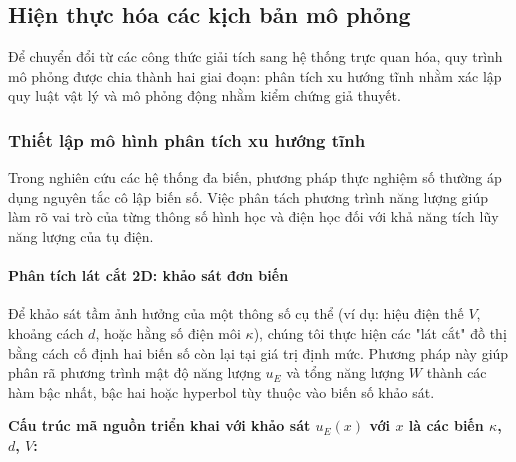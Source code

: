 \subsection{Hiện thực hóa các kịch bản mô phỏng}
Để chuyển đổi từ các công thức giải tích sang hệ thống trực quan hóa, quy trình mô phỏng được chia thành hai giai đoạn: phân tích xu hướng tĩnh nhằm xác lập quy luật vật lý và mô phỏng động nhằm kiểm chứng giả thuyết.
\subsubsection{Thiết lập mô hình phân tích xu hướng tĩnh}
Trong nghiên cứu các hệ thống đa biến, phương pháp thực nghiệm số thường áp dụng nguyên tắc cô lập biến số. Việc phân tách phương trình năng lượng giúp làm rõ vai trò của từng thông số hình học và điện học đối với khả năng tích lũy năng lượng của tụ điện.
\paragraph{Phân tích lát cắt 2D: khảo sát đơn biến\\}

Để khảo sát tầm ảnh hưởng của một thông số cụ thể (ví dụ: hiệu điện thế $V$, khoảng cách $d$, hoặc hằng số điện môi $\kappa$), chúng tôi thực hiện các "lát cắt" đồ thị bằng cách cố định hai biến số còn lại tại giá trị định mức. Phương pháp này giúp phân rã phương trình mật độ năng lượng $u_E$ và tổng năng lượng $W$ thành các hàm bậc nhất, bậc hai hoặc hyperbol tùy thuộc vào biến số khảo sát.

\textbf{Cấu trúc mã nguồn triển khai với khảo sát $u_E(x)$ với $x$ là các biến $\kappa$, $d$, $V$:}

